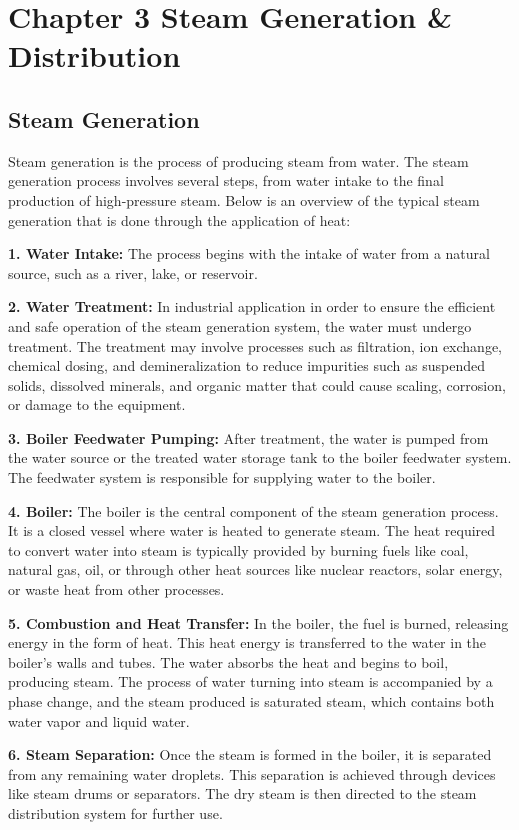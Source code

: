 \section{Chapter 3 Steam Generation \& Distribution}
\subsection{Steam Generation}
Steam generation is the process of producing steam from water. The steam generation process involves several steps, from water intake to the final production of high-pressure steam. Below is an overview of the typical steam generation that is done through the application of heat:

\textbf{1. Water Intake:} The process begins with the intake of water from a natural source, such as a river, lake, or reservoir. 

\textbf{2. Water Treatment:} In industrial application in order to ensure the efficient and safe operation of the steam generation system, the water must undergo treatment. The treatment may involve processes such as filtration, ion exchange, chemical dosing, and demineralization to reduce impurities such as suspended solids, dissolved minerals, and organic matter that could cause scaling, corrosion, or damage to the equipment.

\textbf{3. Boiler Feedwater Pumping:} After treatment, the water is pumped from the water source or the treated water storage tank to the boiler feedwater system. The feedwater system is responsible for supplying water to the boiler.

\textbf{4. Boiler:} The boiler is the central component of the steam generation process. It is a closed vessel where water is heated to generate steam. The heat required to convert water into steam is typically provided by burning fuels like coal, natural gas, oil, or through other heat sources like nuclear reactors, solar energy, or waste heat from other processes.

\textbf{5. Combustion and Heat Transfer:} In the boiler, the fuel is burned, releasing energy in the form of heat. This heat energy is transferred to the water in the boiler's walls and tubes. The water absorbs the heat and begins to boil, producing steam. The process of water turning into steam is accompanied by a phase change, and the steam produced is saturated steam, which contains both water vapor and liquid water.

\textbf{6. Steam Separation:} Once the steam is formed in the boiler, it is separated from any remaining water droplets. This separation is achieved through devices like steam drums or separators. The dry steam is then directed to the steam distribution system for further use.

